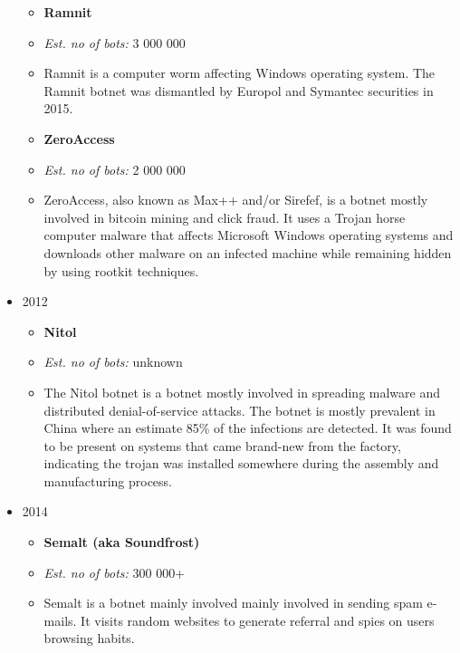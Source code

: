 \documentclass[]{article}
\begin{document}
\begin{itemize}
{\begin{itemize}
	\item \textbf{Ramnit} \cite{website:ramnit}

	\item \textit{Est. no of bots:} 3 000 000

	\item Ramnit is a computer worm affecting Windows operating system. The Ramnit botnet was dismantled by Europol and Symantec securities in 2015.

	\item \textbf{ZeroAccess} \cite{website:zeroaccess}
	\item \textit{Est. no of bots:} 2 000 000

\item ZeroAccess, also known as Max++ and/or Sirefef, is a botnet mostly involved in bitcoin mining and click fraud. It uses a Trojan horse computer malware that affects Microsoft Windows operating systems and downloads other malware on an infected machine while remaining hidden by using rootkit techniques.
\end{itemize}
}
\item {2012
\begin{itemize}
	\item \textbf{Nitol} \cite{website:nitol}

	\item \textit{Est. no of bots:} unknown

	\item The Nitol botnet is a botnet mostly involved in spreading malware and distributed denial-of-service attacks. The botnet is mostly prevalent in China where an estimate 85\% of the infections are detected. It was found to be present on systems that came brand-new from the factory, indicating the trojan was installed somewhere during the assembly and manufacturing process.
\end{itemize}
}
	\item{ 2014
\begin{itemize}
	\item \textbf{Semalt (aka Soundfrost)} \cite{website:semalt}

	\item \textit{Est. no of bots:} 300 000+

	\item Semalt is a botnet mainly involved mainly involved in sending spam e-mails. It visits random websites to generate referral and spies on users browsing habits.
\end{itemize}

}
\end{itemize}
\end{document}
